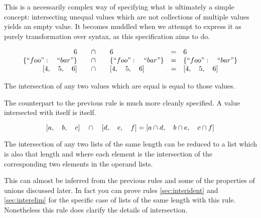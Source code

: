 \documentclass[letterpaper]{article}
\begin{document}
This is a necessarily complex way of specifying what is ultimately a simple
concept: intersecting unequal values which are not collections of multiple
values yields an empty value. It becomes muddled when we attempt to express it
as purely transformation over syntax, as this specification aims to do.

\begin{prule}
\label{sec:interident}
\begin{equation}
\begin{array}{rclcl}
6 \quad&\cap&\quad 6 & = & 6 \\
\{``foo":\quad``bar"\} \quad&\cap&\quad \{``foo":\quad``bar"\}  & = & \{``foo":\quad``bar"\} \\
{[}4,\quad5,\quad6] \quad&\cap&\quad {[}4,\quad5,\quad6] & = & {[}4,\quad5,\quad6] \\
\end{array}
\end{equation}

The intersection of any two values which are equal is equal to those values.
\end{prule}

The counterpart to the previous rule is much more cleanly specified. A value
intersected with itself is itself.

\begin{prule}
\label{sec:interlist}
\begin{equation}
{[}a,\quad b,\quad c] \quad\cap\quad {[}d,\quad e,\quad f]  =  {[}a\cap d,\quad
b\cap e,\quad c\cap f] \\
\end{equation}

The intersection of any two lists of the same length can be reduced to a list
which is also that length and where each element is the intersection of the
corresponding two elements in the operand lists.
\end{prule}

This can almost be inferred from the previous rules and some of the properties
of unions discussed later. In fact you can prove rules \ref{sec:interident} and
\ref{sec:interelim} for the specific case of lists of the same length with this
rule. Nonetheless this rule does clarify the details of intersection.
\end{document}
